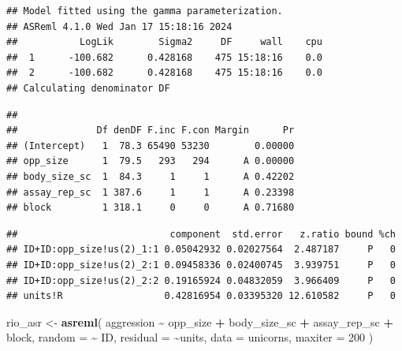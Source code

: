 \documentclass[
  12pt,
]{book}
\newenvironment{Shaded}{\begin{snugshade}}{\end{snugshade}}
\newcommand{\DataTypeTok}[1]{\textcolor[rgb]{0.13,0.29,0.53}{#1}}
\newcommand{\DecValTok}[1]{\textcolor[rgb]{0.00,0.00,0.81}{#1}}
\newcommand{\KeywordTok}[1]{\textcolor[rgb]{0.13,0.29,0.53}{\textbf{#1}}}
\newcommand{\NormalTok}[1]{#1}
\newcommand{\OperatorTok}[1]{\textcolor[rgb]{0.81,0.36,0.00}{\textbf{#1}}}
\newcommand{\StringTok}[1]{\textcolor[rgb]{0.31,0.60,0.02}{#1}}
\begin{document}
\begin{verbatim}
## Model fitted using the gamma parameterization.
## ASReml 4.1.0 Wed Jan 17 15:18:16 2024
##           LogLik        Sigma2     DF     wall    cpu
##  1      -100.682      0.428168    475 15:18:16    0.0
##  2      -100.682      0.428168    475 15:18:16    0.0
## Calculating denominator DF
\end{verbatim}

\begin{verbatim}
## 
##              Df denDF F.inc F.con Margin      Pr
## (Intercept)   1  78.3 65490 53230        0.00000
## opp_size      1  79.5   293   294      A 0.00000
## body_size_sc  1  84.3     1     1      A 0.42202
## assay_rep_sc  1 387.6     1     1      A 0.23398
## block         1 318.1     0     0      A 0.71680
\end{verbatim}

\begin{Shaded}
\end{Shaded}

\begin{verbatim}
##                           component  std.error   z.ratio bound %ch
## ID+ID:opp_size!us(2)_1:1 0.05042932 0.02027564  2.487187     P   0
## ID+ID:opp_size!us(2)_2:1 0.09458336 0.02400745  3.939751     P   0
## ID+ID:opp_size!us(2)_2:2 0.19165924 0.04832059  3.966409     P   0
## units!R                  0.42816954 0.03395320 12.610582     P   0
\end{verbatim}

\begin{Shaded}
\begin{Highlighting}[]
\NormalTok{rio\_asr \textless{}{-}}\StringTok{ }\KeywordTok{asreml}\NormalTok{(}
\NormalTok{  aggression }\OperatorTok{\textasciitilde{}}\StringTok{ }\NormalTok{opp\_size }\OperatorTok{+}\StringTok{ }\NormalTok{body\_size\_sc }\OperatorTok{+}\StringTok{ }\NormalTok{assay\_rep\_sc }\OperatorTok{+}\StringTok{ }\NormalTok{block,}
  \DataTypeTok{random =} \OperatorTok{\textasciitilde{}}\StringTok{ }\NormalTok{ID,}
  \DataTypeTok{residual =} \OperatorTok{\textasciitilde{}}\NormalTok{units,}
  \DataTypeTok{data =}\NormalTok{ unicorns,}
  \DataTypeTok{maxiter =} \DecValTok{200}
\NormalTok{)}
\end{Highlighting}
\end{Shaded}
\end{document}
